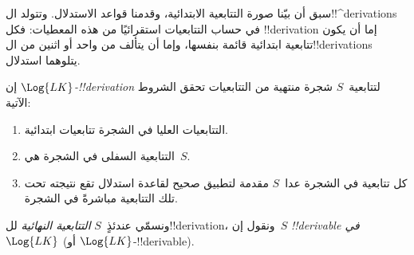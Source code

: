 \documentclass[../../../include/open-logic-section]{subfiles}
\begin{document}
      {}
      {}


\begin{explain}
سبق أن بيّنا صورة التتابعية الابتدائية، وقدمنا قواعد الاستدلال.
وتتولد ال!!^{derivation}s في حساب التتابعيات استقرائيًا من هذه
المعطيات: فكل !!{derivation} إما أن يكون تتابعية ابتدائية قائمة
بنفسها، وإما أن يتألف من واحد أو اثنين من ال!!{derivation}s يتلوهما
استدلال.
\end{explain}

\begin{defn}
إن \emph{$\Log{LK}$-!!{derivation}} لتتابعية~$S$ شجرة منتهية من
التتابعيات تحقق الشروط الآتية:
\begin{enumerate}
\item التتابعيات العليا في الشجرة تتابعيات ابتدائية.
\item التتابعية السفلى في الشجرة هي~$S$.
\item كل تتابعية في الشجرة عدا~$S$ مقدمة لتطبيق صحيح لقاعدة استدلال
  تقع نتيجته تحت تلك التتابعية مباشرةً في الشجرة.
\end{enumerate}
ونسمّي عندئذٍ~$S$ \emph{التتابعية النهائية} لل!!{derivation}، ونقول
إن~$S$ \emph{!!{derivable} في $\Log{LK}$} (أو
$\Log{LK}$-!!{derivable}).
\end{defn}
\end{document}
